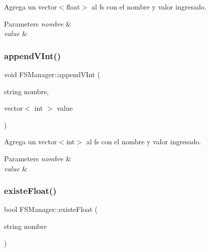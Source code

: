 Agrega un vector$<$float$>$ al fs con el nombre y valor ingresado. 


\begin{DoxyParams}{Parameters}
{\em nombre} & \\
\hline
{\em value} & \\
\hline
\end{DoxyParams}
\mbox{\label{classFSManager_a5c589c828a37b0d0231fd47436ba63b5}} 
\subsubsection{\texorpdfstring{append\+V\+Int()}{appendVInt()}}
{\footnotesize\ttfamily void F\+S\+Manager\+::append\+V\+Int (\begin{DoxyParamCaption}\item[{string}]{nombre,  }\item[{vector$<$ int $>$}]{value }\end{DoxyParamCaption})\hspace{0.3cm}{\ttfamily [inline]}}



Agrega un vector$<$int$>$ al fs con el nombre y valor ingresado. 


\begin{DoxyParams}{Parameters}
{\em nombre} & \\
\hline
{\em value} & \\
\hline
\end{DoxyParams}
\mbox{\label{classFSManager_a73be0c1d4d7aa7584f41c7bab0075bb2}} 
\subsubsection{\texorpdfstring{existe\+Float()}{existeFloat()}}
{\footnotesize\ttfamily bool F\+S\+Manager\+::existe\+Float (\begin{DoxyParamCaption}\item[{string}]{nombre }\end{DoxyParamCaption})\hspace{0.3cm}{\ttfamily [inline]}}




